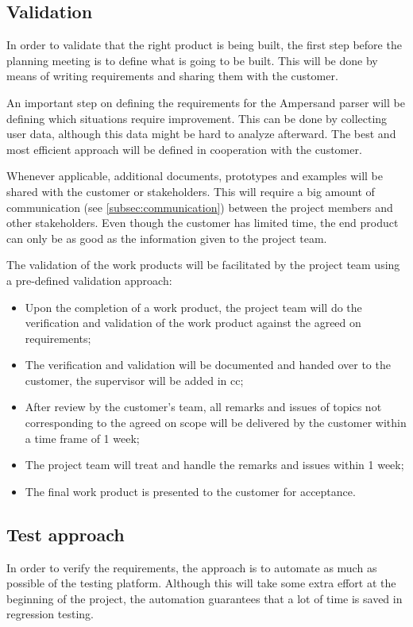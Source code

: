 \subsection{Validation}
In order to validate that the right product is being built, the first step before the planning meeting is to define what is going to be built.
This will be done by means of writing requirements and sharing them with the customer.

An important step on defining the requirements for the Ampersand parser will be defining which situations require improvement.
This can be done by collecting user data, although this data might be hard to analyze afterward.
The best and most efficient approach will be defined in cooperation with the customer.

Whenever applicable, additional documents, prototypes and examples will be shared with the customer or stakeholders.
This will require a big amount of communication (see \autoref{subsec:communication}) between the project members and other stakeholders.
Even though the customer has limited time, the end product can only be as good as the information given to the project team.

The validation of the work products will be facilitated by the project team using a pre-defined validation approach:
\begin{itemize}
	\item Upon the completion of a work product, the project team will do the verification and validation of the work product against the agreed on requirements;
	\item The verification and validation will be documented and handed over to the customer, the supervisor will be added in cc;
	\item After review by the customer's team, all remarks and issues of topics not corresponding to the agreed on scope will be delivered by the customer within a time frame of 1 week;
	\item The project team will treat and handle the remarks and issues within 1 week;
	\item The final work product is presented to the customer for acceptance.
\end{itemize}

\subsection{Test approach}
In order to verify the requirements, the approach is to automate as much as possible of the testing platform.
Although this will take some extra effort at the beginning of the project, the automation guarantees that a lot of time is saved in regression testing.

